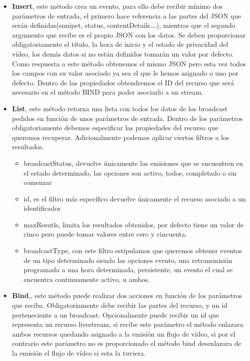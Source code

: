 \begin{itemize}

\item \textbf{Insert}, este método crea un evento, para ello debe recibir mínimo dos  parámetros de entrada, el primero hace referencia a las partes del JSON que serán definidas(snnipet, status, contentDetails….), mientras que el segundo argumento que recibe es el propio JSON con los datos. Se deben proporcionar obligatoriamente el título, la hora de inicio y el estado de privacidad del vídeo, los demás datos si no están definidos tomarán un valor por defecto. Como respuesta a este método obtenemos el mismo JSON pero esta vez todos los campos con su valor asociado ya sea el que le hemos asignado o uno por defecto. Dentro de las propiedades obtendremos el ID del recurso que será necesario en el método BIND para poder asociarlo a un stream.

\item \textbf{List}, este método retorna una lista con todos los datos de los broadcast pedidos en función de unos parámetros de entrada. Dentro de los parámetros obligatoriamente debemos especificar las propiedades del recurso que queremos recuperar. Adicionalmente podemos aplicar ciertos filtros a los resultados.
    \begin{itemize}
        \item broadcastStatus, devuelve únicamente las emisiones que se encuentren en el estado determinado, las opciones son activo, todos, completado o sin comenzar
        \item id, es el filtro más específico devuelve únicamente el recurso asociado a un identificador
        \item maxResutls, limita los resultados obtenidos, por defecto tiene un valor de cinco pero puede tomar valores entre cero y cincuenta.
        \item broadcastType, con este filtro estipulamos que queremos obtener eventos de un tipo determinado siendo las opciones evento, una retransmisión programada a una hora determinada, persistente, un evento el cual se encuentra continuamente activo, u ambos.
    \end{itemize}
    
\item \textbf{Bind},, este método puede realizar dos acciones en función de los parámetros que reciba. Obligatoriamente debe recibir las partes del recurso, y un id perteneciente a un broadcast. Opcionalmente puede recibir un id que representa un recurso livestream, si recibe este parámetro el método enlazara ambos recursos quedando asignado a la emisión un flujo de vídeo, si por el contrario este parámetro no es proporcionado el método bind desenlazara de la emisión el flujo de vídeo si esta la tuviera.


\end{itemize}
